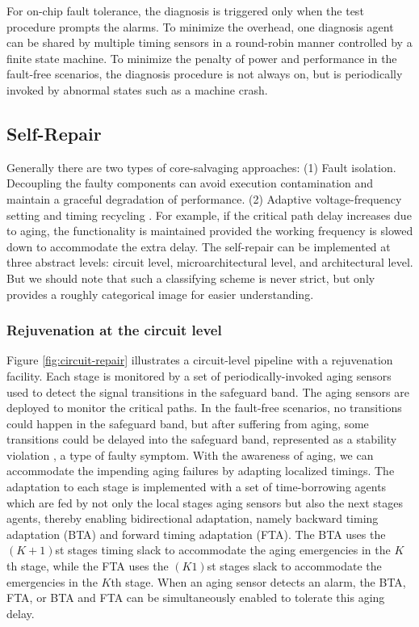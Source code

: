 For on-chip fault tolerance, the diagnosis is triggered only when the test procedure prompts the alarms. To minimize the overhead, one diagnosis agent can be shared by multiple timing sensors in a round-robin manner \cite{ReviveNet} controlled by a finite state machine. To minimize the penalty of power and performance in the fault-free scenarios, the diagnosis procedure is not always on, but is periodically invoked by abnormal states such as a machine crash.

\subsection{Self-Repair}
Generally there are two types of core-salvaging approaches: (1) Fault isolation. Decoupling the faulty components \cite{aitken2012yield} can avoid execution contamination and maintain a graceful degradation of performance. (2) Adaptive voltage-frequency setting and timing recycling \cite{tschanz201045nm}. For example, if the critical path delay increases due to aging, the functionality is maintained provided the working frequency is slowed down to accommodate the extra delay. The self-repair can be implemented at three abstract levels: circuit level, microarchitectural level, and architectural level. But we should note that such a classifying scheme is never strict, but only provides a roughly categorical image for easier understanding.

\subsubsection{Rejuvenation at the circuit level}
Figure \ref{fig:circuit-repair} illustrates a circuit-level pipeline with a rejuvenation facility. Each stage is monitored by a set of periodically-invoked aging sensors used to detect the signal transitions in the safeguard band. The aging sensors are deployed to monitor the critical paths. In the fault-free scenarios, no transitions could happen in the safeguard band, but after suffering from aging, some transitions could be delayed into the safeguard band, represented as a stability violation \cite{yan2010svfd}, a type of faulty symptom. With the awareness of aging, we can accommodate the impending aging failures by adapting localized timings. The adaptation to each stage is implemented with a set of time-borrowing agents which are fed by not only the local stages aging sensors but also the next stages agents, thereby enabling bidirectional adaptation, namely backward timing adaptation (BTA) and forward timing adaptation (FTA). The BTA uses the $(K + 1)$st stages timing slack to accommodate the aging emergencies in the $K$th stage, while the FTA uses the $(K1)$st stages slack to accommodate the emergencies in the $K$th stage. When an aging sensor detects an alarm, the BTA, FTA, or BTA and FTA can be simultaneously enabled to tolerate this aging delay.


